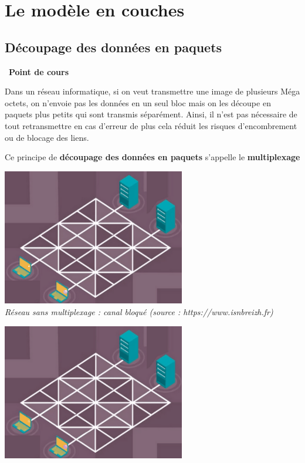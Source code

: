 \documentclass[
  11pt,
]{article}
\newcounter{cours}
\newenvironment{cours}[1]
{\par \medskip   \addtocounter{cours}{1} \noindent  
\begin{bclogo}[arrondi =0.1,  ombre = true, barre=none, logo=\bcbook, marge=4]{~\textbf{Point de cours} \textbf{\thecours} {\itshape #1} }  \par}
{
\end{bclogo}
 \par \bigskip }
\begin{document}
\hypertarget{le-moduxe8le-en-couches}{%
\section{Le modèle en couches}\label{le-moduxe8le-en-couches}}

\hypertarget{duxe9coupage-des-donnuxe9es-en-paquets}{%
\subsection{Découpage des données en
paquets}\label{duxe9coupage-des-donnuxe9es-en-paquets}}

\begin{cours}{}

Dans un réseau informatique, si on veut transmettre une image de
plusieurs Méga octets, on n'envoie pas les données en un seul bloc mais
on les découpe en paquets plus petits qui sont transmis séparément.
Ainsi, il n'est pas nécessaire de tout retransmettre en cas d'erreur de
plus cela réduit les risques d'encombrement ou de blocage des liens.

Ce principe de \textbf{découpage des données en paquets} s'appelle le
\textbf{multiplexage}

\end{cours}

\includegraphics[width=0.6\textwidth,height=\textheight]{images/multiplex2.gif}\\

\emph{Réseau sans multiplexage : canal bloqué (source :
https://www.isnbreizh.fr)}

\includegraphics[width=0.6\textwidth,height=\textheight]{images/multiplex4.gif}\\
\end{document}
